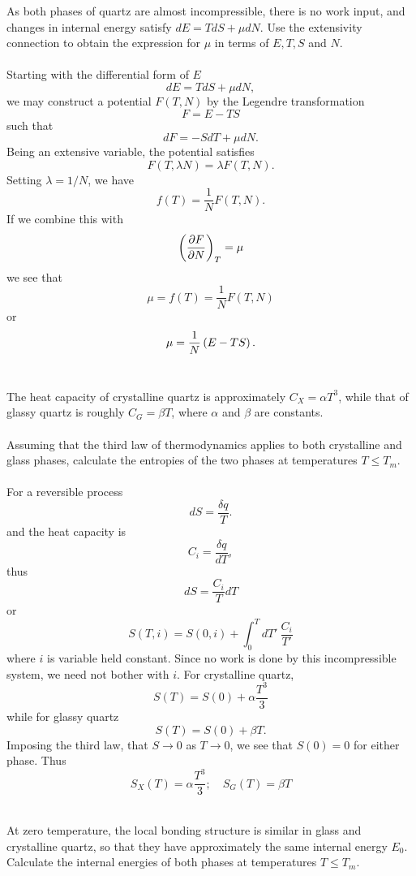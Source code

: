 \documentclass[11pt,letterpaper]{article}
\begin{document}
	\benum
		\item
		As both phases of quartz are almost incompressible, there is no work input, and changes in internal energy satisfy 
		$dE = TdS+\mu dN$. Use the extensivity connection to obtain the expression for $\mu$ in terms of $E,T,S$ and $N$. 
		\\
		\\
		Starting with the differential form of $E$
		\[
			dE = TdS+\mu dN,
		\]
		we may construct a potential $F(T,N)$ by the Legendre transformation
		\[
			F = E-TS
		\]
		such that
		\[
			dF = -SdT+\mu dN.
		\]
		Being an extensive variable, the potential satisfies
		\[
			F(T,\lambda N) = \lambda F(T,N).
		\]
		Setting $\lambda = 1/N$, we have
		\[
			f(T) = \frac{1}{N} F(T,N).
		\]
		If we combine this with
		\[
			\plr{\pdiff[F]{N}}_T = \mu 
		\]
		we see that
		\[
			\mu = f(T) = \frac{1}{N}F(T,N)
		\]
		or
		\[
			\mu = \frac{1}{N}\plr{E-TS}.
		\]
		\\
		\item 
		The heat capacity of crystalline quartz is approximately $C_X = \alpha T^3$, while that of glassy quartz is roughly
		$C_G = \beta T$, where $\alpha$ and $\beta$ are constants.
		\\
		\\
		Assuming that the third law of thermodynamics applies to both crystalline and glass phases, calculate the entropies of the two
		phases at temperatures $T\le T_m$.
		\\
		\\
		For a reversible process
		\[
			dS = \frac{\delta q}{T}.
		\]
		and the heat capacity is
		\[
			C_i = \frac{\delta q}{dT},
		\]
		thus
		\[
			dS = \frac{C_i}{T}dT
		\]
		or
		\[
			S(T,i) = S(0,i) +\int_0^{T} dT'\ \frac{C_i}{T'}
		\]
		where $i$ is variable held constant. Since no work is done by this incompressible system, we need not bother with $i$. 
		For crystalline quartz,
		\[
			S(T) = S(0) + \alpha \frac{T^3}{3} 
		\]
		while for glassy quartz
		\[
			S(T) = S(0)+\beta T.
		\]
		Imposing the third law, that $S\to 0$ as $T\to 0$, we see that $S(0) =0$ for either phase. Thus
		\[
			S_X(T) = \alpha \frac{T^3}{3};\quad
			S_G(T) = \beta T
		\]
		\\
		\item
		At zero temperature, the local bonding structure is similar in glass and crystalline quartz, so that they have approximately
		the same internal energy $E_0$. Calculate the internal energies of both phases at temperatures $T\le T_m$. 
		\\
\end{document}
